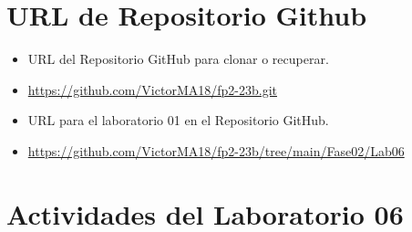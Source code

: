 \documentclass{article}
\begin{document}
	\section{URL de Repositorio Github}
	\begin{itemize}
		\item URL del Repositorio GitHub para clonar o recuperar.
		\item \url{https://github.com/VictorMA18/fp2-23b.git}
		\item URL para el laboratorio 01 en el Repositorio GitHub.
		\item \url{https://github.com/VictorMA18/fp2-23b/tree/main/Fase02/Lab06}
	\end{itemize}
	
	\section{Actividades del Laboratorio 06}
	
\end{document}
